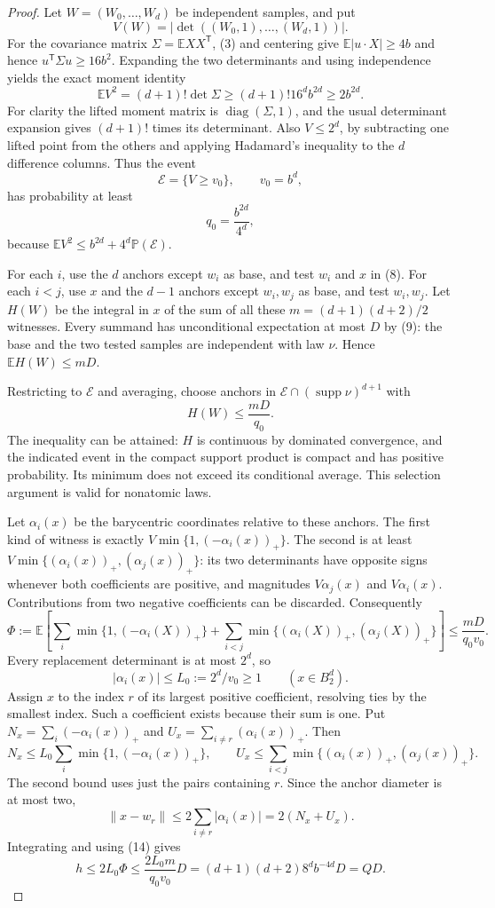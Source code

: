 \documentclass[11pt]{article}
\newcommand{\supp}{\operatorname{supp}}
\newcommand{\E}{\mathbb E}
\newcommand{\B}{B_2^d}
\newcommand{\pos}[1]{(#1)_+}
\begin{document}
\begin{proof}
Let $W=(W_0,\ldots,W_d)$ be independent samples, and put
\[
 V(W)=|\det((W_0,1),\ldots,(W_d,1))|.
\]
For the covariance matrix $\Sigma=\E XX^{\mathsf T}$, (3) and centering
give $\E|u\cdot X|\ge4b$ and hence
$u^{\mathsf T}\Sigma u\ge16b^2$. Expanding the two determinants and using
independence yields the exact moment identity
\[
 \E V^2=(d+1)!\det\Sigma\ge(d+1)!16^d b^{2d}\ge2b^{2d}.
 \tag{11}
\]
For clarity the lifted moment matrix is $\operatorname{diag}(\Sigma,1)$,
and the usual determinant expansion gives $(d+1)!$ times its determinant.
Also $V\le2^d$, by subtracting one lifted point from the others and applying
Hadamard's inequality to the $d$ difference columns. Thus the event
\[
 \mathcal E=\{V\ge v_0\},\qquad v_0=b^d,
\]
has probability at least
\[
 q_0=\frac{b^{2d}}{4^d},
 \tag{12}
\]
because $\E V^2\le b^{2d}+4^d\mathbb P(\mathcal E)$.

For each $i$, use the $d$ anchors except $w_i$ as base, and test $w_i$ and
$x$ in (8). For each $i<j$, use $x$ and the $d-1$ anchors except $w_i,w_j$
as base, and test $w_i,w_j$. Let $H(W)$ be the integral in $x$ of the sum
of all these $m=(d+1)(d+2)/2$ witnesses. Every summand has unconditional
expectation at most $D$ by (9): the base and the two tested samples are
independent with law $\nu$. Hence $\E H(W)\le mD$.

Restricting to $\mathcal E$ and averaging, choose anchors in
$\mathcal E\cap(\supp\nu)^{d+1}$ with
\[
 H(W)\le\frac{mD}{q_0}.
 \tag{13}
\]
The inequality can be attained: $H$ is continuous by dominated convergence,
and the indicated event in the compact support product is compact and
has positive probability. Its minimum does not exceed its conditional
average. This selection argument is valid for nonatomic laws.

Let $\alpha_i(x)$ be the barycentric coordinates relative to these anchors.
The first kind of witness is exactly
$V\min\{1,\pos{-\alpha_i(x)}\}$. The second is at least
$V\min\{\pos{\alpha_i(x)},\pos{\alpha_j(x)}\}$: its two determinants have
opposite signs whenever both coefficients are positive, and magnitudes
$V\alpha_j(x)$ and $V\alpha_i(x)$. Contributions from two negative
coefficients can be discarded. Consequently
\[
 \Phi:=\E\left[\sum_i\min\{1,\pos{-\alpha_i(X)}\}
   +\sum_{i<j}\min\{\pos{\alpha_i(X)},\pos{\alpha_j(X)}\}\right]
 \le\frac{mD}{q_0v_0}.
 \tag{14}
\]
Every replacement determinant is at most $2^d$, so
\[
 |\alpha_i(x)|\le L_0:=2^d/v_0\ge1 \qquad (x\in\B).
\]
Assign $x$ to the index $r$ of its largest positive coefficient, resolving
ties by the smallest index. Such a coefficient exists because their sum
is one. Put $N_x=\sum_i\pos{-\alpha_i(x)}$ and
$U_x=\sum_{i\ne r}\pos{\alpha_i(x)}$. Then
\[
 N_x\le L_0\sum_i\min\{1,\pos{-\alpha_i(x)}\},\qquad
 U_x\le\sum_{i<j}\min\{\pos{\alpha_i(x)},\pos{\alpha_j(x)}\}.
\]
The second bound uses just the pairs containing $r$. Since the anchor
diameter is at most two,
\[
 \|x-w_r\|\le2\sum_{i\ne r}|\alpha_i(x)|=2(N_x+U_x).
\]
Integrating and using (14) gives
\[
 h\le2L_0\Phi\le\frac{2L_0m}{q_0v_0}D
 =(d+1)(d+2)8^d b^{-4d}D=QD.
\]


\end{proof}
\end{document}

